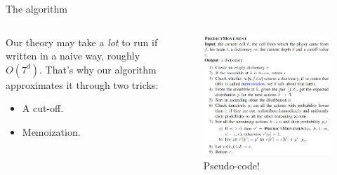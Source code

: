 \documentclass[english]{beamer}
\begin{document}
\begin{frame}{The algorithm}
  \begin{columns}
    \begin{column}{0.55\textwidth}
      Our theory may take a \emph{lot} to run if written in a naive way, roughly $O(7^d)$. That's why our algorithm approximates it through two tricks:

      \begin{itemize}
        \item A cut-off.
        \item Memoization.
      \end{itemize}
    \end{column}
    \begin{column}{0.45\textwidth}
      \begin{figure}
        \centering
        \includegraphics[width=1\textwidth]{images/pseudo_code.png}
        \caption{Pseudo-code!}
      \end{figure}
    \end{column}
  \end{columns}

\end{frame}
\end{document}
